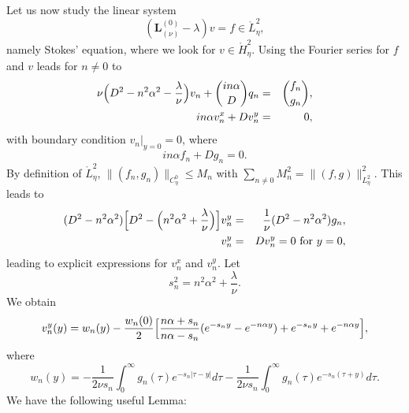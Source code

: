 \documentclass[11pt]{article}
\begin{document}
Let us now study the linear system
\begin{equation*}
(\boldsymbol{L}_{(\nu )}^{(0)}-\lambda )v=f\in \mathring{L}_{\eta}^{2},
\end{equation*}%
namely Stokes' equation, where we look for $v\in \mathring{H}_{\eta}^{2}$. 
Using the Fourier series for $f$ and $v$ leads for $n\neq 0$ to%
\begin{eqnarray} 
\nu \Bigl( D^{2}-n^{2}\alpha ^{2}-\frac{\lambda }{\nu } \Bigr) v_{n}+\binom{in\alpha }{D}%
q_{n} &=&\binom{f_{n}}{g_{n}},  \label{equ for resolv} \\
in\alpha v_{n}^{x}+Dv_{n}^{y} &=&0, \notag
\end{eqnarray}%
with boundary condition $v_{n}|_{y=0}=0$, where 
\begin{equation*}
in\alpha f_{n}+Dg_{n}=0.
\end{equation*}%
By definition of $\mathring{L}^2_\eta$, $\|(f_{n},g_{n})\|_{C_{\eta}^{0}}\leq M_{n}$ with $\sum_{n\neq
0}M_{n}^{2}=\|(f,g)\|_{L_{\eta}^{2}}^{2}$.
This leads to%
\begin{eqnarray}
(D^{2}-n^{2}\alpha ^{2}) \Bigl[ D^{2}- \Bigl( n^{2}\alpha ^{2}+\frac{\lambda }{\nu } \Bigr) \Bigr]v_{n}^{y} 
&=&\frac{1}{\nu }(D^{2}-n^{2}\alpha ^{2})g_{n},
\label{equ for resolv2} \\
v_{n}^{y} &=&Dv_{n}^{y}=0\text{ for }y=0,  \notag
\end{eqnarray}%
leading to explicit expressions for $v_{n}^{x}$ and $v_{n}^{y}.$ Let 
\begin{equation*}
s_{n}^{2}=n^{2}\alpha ^{2}+\frac{\lambda }{\nu }.
\end{equation*}%
We obtain%
\begin{equation}
v_{n}^{y}(y)=w_{n}(y)-\frac{w_{n}(0)}{2} \Bigl[ \frac{n\alpha +s_{n}}{n\alpha -s_{n}%
}(e^{-s_{n}y}-e^{-n\alpha y})+e^{-s_{n}y}+e^{-n\alpha y} \Bigr],  \label{vn(y)}
\end{equation}%
where%
\begin{equation}
w_{n}(y)=-\frac{1}{2\nu s_{n}}\int_{0}^{\infty }g_{n}(\tau )e^{-s_{n}|\tau
-y|}d\tau -\frac{1}{2\nu s_{n}}\int_{0}^{\infty }g_{n}(\tau )e^{-s_{n}(\tau
+y)}d\tau . \label{wn(y)}
\end{equation}%
We have the following useful Lemma:
\end{document}

